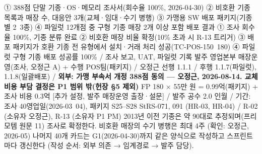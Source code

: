 \documentclass[10pt,a4paper]{article}
\begin{document}
 {① 388점 단말 기종·OS·메모리 조사서(회수율 100\%, 2026-04-30) ② 비호환 기종 목록과 매장 수, 대응안 3개(교체·임대·수기 병행) ③ 가맹용 SW 배포 패키지(기종별 2~3종) ④ 파일럿 12개점 중 구형 기종 매장 2개 이상 포함 배포 결과}
 {① 조사 회수율 100\%, 기종 분류 완료 ② 비호환 매장 비율 확정(10\% 초과 시 R-13 트리거) ③ 배포 패키지가 호환 기종 전 유형에서 설치·거래 처리 성공(TC-POS-150~180) ④ 파일럿 구형 기종 배포 성공률 100\% / 조사 보고, UAT, 파일럿 기록}
 {발주 영업본부 매장운영(조사, 오정근 A) + 수행 POS팀(패키지) / 오정근}
 {선행 1.1.1 / 후행 1.1.7(파일럿), 1.1.8(일괄배포) / \textbf{외부: 가맹 부속서 개정 388점 동의 — 오정근, 2026-08-14. 교체 비용 부담 결정은 P1 범위 밖(헌장 §5 제외)}}
 {FP 180 × 55만 원 = 0.99억(패키지) + 조사 비용 0.3억 [추가 설정, 발주 매장운영 출장·설문] / 발주 공수 2.0 인월 / 기간: 조사 40영업일(2026-03~04), 패키지 S25–S28}
 {StRS-071, 091 (HR-03, HR-04) / R-02 (소유자 오정근), R-13 (소유자 P1 PM)}
 {2013년 이전 기종은 약 90대로 추정되며(프리모템 원문 11) 조사로 확정한다. 비호환 매장의 수기 병행은 최대 4주 (확인: 오정근, 2026-05)}
\small 나머지 40개 카드는 G1(2026-04-30)까지 같은 양식으로 작성하고 스프린트마다 갱신한다 (작성 순서: 외부 의존 → 임계경로 → 발주 담당).
\fi
\end{document}

